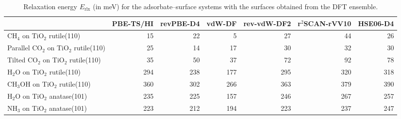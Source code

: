 \begin{table}
\caption{\label{tab:lattice_parameters_tio2}Relaxation energy $E_\text{rlx}$ (in meV) for the adsorbate--surface systems with the  surfaces obtained from the DFT ensemble.}
\begin{tabular}{lrrrrrr}
\toprule
 & PBE-TS/HI & revPBE-D4 & vdW-DF & rev-vdW-DF2 & r$^2$SCAN-rVV10 & HSE06-D4 \\ 
\midrule
CH$_4$ on TiO$_2$ rutile(110) & 15 & 22 & 5 & 27 & 44 & 26 \\
Parallel CO$_2$ on TiO$_2$ rutile(110) & 25 & 14 & 17 & 30 & 32 & 30 \\
Tilted CO$_2$ on TiO$_2$ rutile(110) & 35 & 50 & 37 & 72 & 92 & 78 \\
H$_2$O on TiO$_2$ rutile(110) & 294 & 238 & 177 & 295 & 320 & 318 \\
CH$_3$OH on TiO$_2$ rutile(110) & 360 & 302 & 266 & 363 & 379 & 390 \\
H$_2$O on TiO$_2$ anatase(101) & 235 & 225 & 157 & 246 & 267 & 257 \\
NH$_3$ on TiO$_2$ anatase(101) & 223 & 212 & 194 & 223 & 237 & 247 \\
\bottomrule
\end{tabular}
\end{table}
